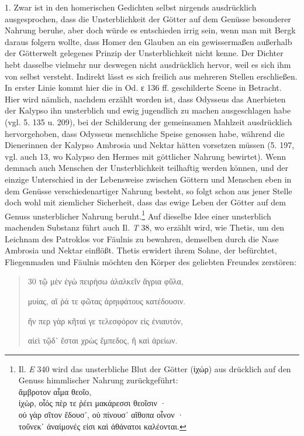 \documentclass[a4paper, 11pt, oneside]{article}
\begin{document}
1. Zwar ist in den homerischen Gedichten selbst nirgends ausdrücklich ausgesprochen, dass die Unsterblichkeit der Götter auf dem Genüsse besonderer Nahrung beruhe, aber doch würde es entschieden irrig sein, wenn man mit Bergk daraus folgern wollte, dass Homer den Glauben an ein gewissermaßen außerhalb der Götterwelt gelegenes Prinzip der Unsterblichkeit nicht kenne. Der Dichter hebt dasselbe vielmehr nur deswegen nicht ausdrücklich hervor, weil es sich ihm von selbst versteht. Indirekt lässt es sich freilich aus mehreren Stellen erschließen. In erster Linie kommt hier die in Od. ε 136 ff. geschilderte Scene in Betracht. Hier wird nämlich, nachdem erzählt worden ist, dass Odysseus das Anerbieten der Kalypso ihn unsterblich und ewig jugendlich zu machen ausgeschlagen habe (vgl. 5. 135 u. 209), bei der Schilderung der gemeinsamen Mahlzeit ausdrücklich hervorgehoben, dass Odysseus menschliche Speise genossen habe, während die Dienerinnen der Kalypso Ambrosia und Nektar hätten vorsetzen müssen (5. 197, vgl. auch 13, wo Kalypso den Hermes mit göttlicher Nahrung bewirtet). Wenn demnach auch Menschen der Unsterblichkeit teilhaftig werden können, und der einzige Unterschied in der Lebensweise zwischen Göttern und Menschen eben in dem Genüsse verschiedenartiger Nahrung besteht, so folgt schon aus jener Stelle doch wohl mit ziemlicher Sicherheit, dass das ewige Leben der Götter auf dem Genuss unsterblicher Nahrung beruht.\footnote{Il. \emph{E} 340 wird das unsterbliche Blut der Götter (ἰχώρ) aus drücklich auf den Genuss himmlischer Nahrung zurückgeführt:\\\hspace*{15mm}ἄμβροτον αἷμα θεοῖο,\\\hspace*{5mm}ἰχὼρ, οἷός πὲρ τε ῥέει μακάρεσσι θεοῖσιν ·\\\hspace*{5mm}οὐ γὰρ σῖτον ἔδουσ᾽, οὐ πίνουσ᾽ αἴθοπα οἷνον ·\\\hspace*{5mm}τοὔνεκ᾽ ἀναίμονές εἰσι καὶ ἀθάνατοι καλέονται.} Auf dieselbe Idee einer unsterblich machenden Substanz führt auch Il. \emph{T} 38, wo erzählt wird, wie Thetis, um den Leichnam des Patroklos vor Fäulnis zu bewahren, demselben durch die Nase Ambrosia und Nektar einflößt. Thetis erwidert ihrem Sohne, der befürchtet, Fliegenmaden und Fäulnis möchten den Körper des geliebten Freundes zerstören:
\begin{quotation}
30 τῷ μὲν ἐγὼ πειρήσω ἀλαλκεῖν ἄγρια φῦλα,

μυίας, αἵ ῥά τε φῶτας ἀρηιφάτους κατέδουσιν.

ἤν περ γὰρ κῆταί γε τελεσφόρον εἰς ἐνιαυτόν,

αἰεὶ τῷδ᾽ ἔσται χρὼς ἔμπεδος, ἢ καὶ ἀρείων.
\end{quotation}
\end{document}
